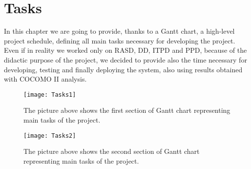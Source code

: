 \chapter{Tasks}
In this chapter we are going to provide, thanks to a Gantt chart, a high-level project schedule, defining all main tasks necessary for developing the project. Even if in reality we worked only on RASD, DD, ITPD and PPD, because of the didactic purpose of the project, we decided to provide also the time necessary for developing, testing and finally deploying the system, also using results obtained with COCOMO II analysis.

\begin{figure}[H]
	\centering
	\texttt{[image: Tasks1]}
	\caption[Tasks-1]{The picture above shows the first section of Gantt chart representing main tasks of the project.}
	\label{fig:Tasks-1}
\end{figure}

\begin{figure}[H]
	\centering
	\texttt{[image: Tasks2]}
	\caption[Tasks-1]{The picture above shows the second section of Gantt chart representing main tasks of the project.}
	\label{fig:Tasks-2}
\end{figure}